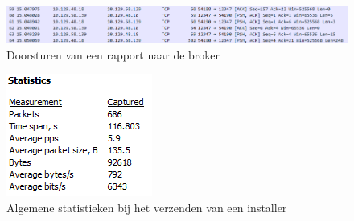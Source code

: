 \begin{figure}
\centering
\includegraphics[scale=0.9]{afbeelding/network/rapport.png}
\caption{Doorsturen van een rapport naar de broker}
\label{fig:network:rapport}
\end{figure}

\begin{figure}[!ht]
\centering
\includegraphics[scale=1]{afbeelding/network/statistics.png}
\caption{Algemene statistieken bij het verzenden van een installer}
\label{fig:network:stats}
\end{figure}